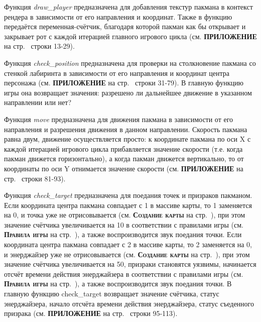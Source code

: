 Функция \textit{draw\_player} предназначена для добавления текстур пакмана в контекст рендера в зависимости от его направления и координат. Также в функцию передаётся переменная-счётчик, благодаря которой пакман как бы открывает и закрывает рот с каждой итерацией главного игрового цикла (см. \textbf{\textsc{ПРИЛОЖЕНИЕ}} на стр.~\pageref{code:player} строки 13-29).

Функция \textit{check\_position} предназначена для проверки на столкновение пакмана со стенкой лабиринта в зависимости от его направления и координат центра персонажа (см. \textbf{\textsc{ПРИЛОЖЕНИЕ}} на стр.~\pageref{code:player} строки 31-79). В главную функцию игры она возвращает значения: разрешено ли дальнейшее движение в указанном направлении или нет?

Функция \textit{move} предназначена для движения пакмана в зависимости от его направления и разрешения движения в данном направлении. Скорость пакмана равна двум, движение осуществляется просто: к координате пакмана по оси X с каждой итерацией игрового цикла прибавляется значение скорости (т.е. когда пакман движется горизонтально), а когда пакман движется вертикально, то от координаты по оси Y отнимается значение скорости (см. \textbf{\textsc{ПРИЛОЖЕНИЕ}} на стр.~\pageref{code:player} строки 81-93).

Функция \textit{check\_target} предназначена для поедания точек и призраков пакманом. Если координата центра пакмана совпадает с 1 в массиве карты, то 1 заменяется на 0, и точка уже не отрисовывается (см. \textbf{\textsc{Создание карты}} на стр.~\pageref{subsec:ch02/sec01/sub04}), при этом значение счётчика увеличивается на 10 в соответствии с правилами игры (см. \textbf{\textsc{Правила игры}} на стр.~\pageref{subsec:ch01/sec04/subsec02}), а также воспроизводится звук поедания точки. Если координата центра пакмана совпадает с 2 в массиве карты, то 2 заменяется на 0, и энерджайзер уже не отрисовывается (см. \textbf{\textsc{Создание карты}} на стр.~\pageref{subsec:ch02/sec01/sub04}), при этом значение счётчика увеличивается на 50, призраки становятся уязвимы, начинается отсчёт времени действия энерджайзера в соответствии с правилами игры (см. \textbf{\textsc{Правила игры}} на стр.~\pageref{subsec:ch01/sec04/subsec02}), а также воспроизводится звук поедания точки. В главную функцию check\_target возвращает значение счётчика, статус энерджайзера, начало отсчёта времени действия энерджайзера, статус съеденного призрака (см. \textbf{\textsc{ПРИЛОЖЕНИЕ}} на стр.~\pageref{code:player} строки 95-113).

